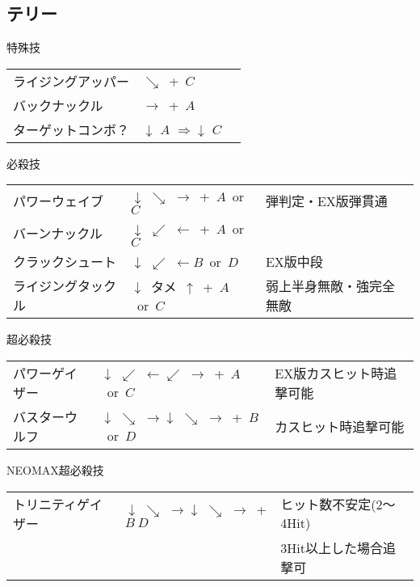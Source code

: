 \documentclass[a4j,11pt]{jarticle}
\def\hado{$\downarrow$ $\searrow$ $\rightarrow$}%
\def\tatsu{$\downarrow$ $\swarrow$ $\leftarrow$}%
\def\Cancel{$\Longrightarrow$}
\begin{document}
\subsection{テリー}
\begin{itembox}[l]{特殊技}
\begin{tabular}{lll}
ライジングアッパー&$\searrow$\ +\ $C$&\\
バックナックル&$\rightarrow$\ +\ $A$&\\
ターゲットコンボ？&$\downarrow$ $A$ \Cancel $\downarrow$ $C$
\end{tabular}
\end{itembox}
\begin{itembox}[l]{必殺技}
\begin{tabular}{lll}
パワーウェイブ&\hado\ +\ $A$\ or\ $C$&弾判定・EX版弾貫通\\
バーンナックル&\tatsu\ +\ $A$\ or\ $C$&\\
クラックシュート&\tatsu $B$\ or\ $D$&EX版中段\\
ライジングタックル&$\downarrow$\ タメ\ $\uparrow$\ +\ $A$\ or\ $C$&弱上半身無敵・強完全無敵
\end{tabular}
\end{itembox}
\begin{itembox}[l]{超必殺技}
\begin{tabular}{lll}
パワーゲイザー&\tatsu $\swarrow$ $\rightarrow$\ +\ $A$\ or\ $C$&EX版カスヒット時追撃可能\\
バスターウルフ&\hado\hado\ +\ $B$\ or\ $D$&カスヒット時追撃可能
\end{tabular}
\end{itembox}
\begin{itembox}[l]{NEOMAX超必殺技}
\begin{tabular}{lll}
トリニティゲイザー&\hado\hado\ +$B\ D$&ヒット数不安定(2～4Hit)\\
&&3Hit以上した場合追撃可
\end{tabular}
\end{itembox}
\newpage
\end{document}

